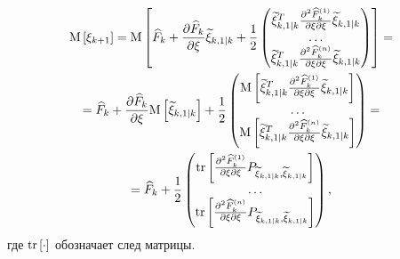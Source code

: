 \begin{multline} \label{equation:filtering:in_states:extended_kalman:state_expectation}
    \mathrm{M} \left [ \xi_{k+1} \right ]
        = \mathrm{M} \left [ 
            \widehat{F}_k
            + \frac{\partial \widehat{F}_k}{\partial \xi} \widetilde{\xi}_{k,1|k}
            + \frac{1}{2}
                \begin{pmatrix}
                    \widetilde{\xi}_{k,1|k}^T \frac{\partial^2 \widehat{F}_k^{(1)}}{{\partial \xi}{\partial \xi}} \widetilde{\xi}_{k,1|k} \\
                    \dots \\
                    \widetilde{\xi}_{k,1|k}^T \frac{\partial^2 \widehat{F}_k^{(n)}}{{\partial \xi}{\partial \xi}} \widetilde{\xi}_{k,1|k}
                \end{pmatrix}
         \right ] = \\
    = \widehat{F}_k
        + \frac{\partial \widehat{F}_k}{\partial \xi} \mathrm{M} \left [ \widetilde{\xi}_{k,1|k} \right ]
        + \frac{1}{2}
            \begin{pmatrix}
                \mathrm{M} \left [ \widetilde{\xi}_{k,1|k}^T \frac{\partial^2 \widehat{F}_k^{(1)}}{{\partial \xi}{\partial \xi}} \widetilde{\xi}_{k,1|k} \right ] \\
                \dots \\
                \mathrm{M} \left [ \widetilde{\xi}_{k,1|k}^T \frac{\partial^2 \widehat{F}_k^{(n)}}{{\partial \xi}{\partial \xi}} \widetilde{\xi}_{k,1|k} \right ]
            \end{pmatrix} = \\
    = \widehat{F}_k
        + \frac{1}{2}
            \begin{pmatrix}
                \mathrm{tr} \left [ \frac{\partial^2 \widehat{F}_k^{(1)}}{{\partial \xi}{\partial \xi}} P_{\widetilde{\xi}_{k,1|k}, \widetilde{\xi}_{k,1|k}} \right ] \\
                \dots \\
                \mathrm{tr} \left [ \frac{\partial^2 \widehat{F}_k^{(n)}}{{\partial \xi}{\partial \xi}} P_{\widetilde{\xi}_{k,1|k}, \widetilde{\xi}_{k,1|k}} \right ]
            \end{pmatrix}
    ,
\end{multline}
где $\mathrm{tr} \left [ \cdot \right ]$ обозначает след матрицы.

